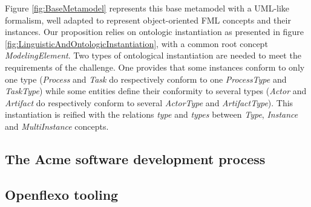 Figure \ref{fig:BaseMetamodel} represents this base metamodel with a UML-like formalism, well adapted to represent object-oriented FML concepts and their instances. Our proposition relies on ontologic instantiation as presented in figure \ref{fig:LinguisticAndOntologicInstantiation}, with a common root concept \textit{ModelingElement}. Two types of ontological instantiation are needed to meet the requirements of the challenge. One provides that some instances conform to only one type (\textit{Process} and \textit{Task} do respectively conform to one \textit{ProcessType} and \textit{TaskType}) while some entities define their conformity to several types (\textit{Actor} and \textit{Artifact} do respectively conform to several \textit{ActorType} and \textit{ArtifactType}). This instantiation is reified with the relations \textit{type} and \textit{types} between \textit{Type}, \textit{Instance} and \textit{MultiInstance} concepts.  


\subsection{The Acme software development process}

\subsection{Openflexo tooling}



